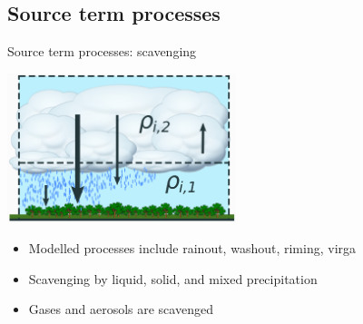 \documentclass[10pt]{beamer}
\begin{document}
\subsection{Source term processes}
\frame{\sectionpage}

\begin{frame}[fragile]{Source term processes: scavenging}
    \begin{center}
    \includegraphics[width=0.5\textwidth]{box-model-scav.eps}
    \end{center}
    \begin{itemize}
        \item Modelled processes include rainout, washout, riming, virga
        \item Scavenging by liquid, solid, and mixed precipitation
        \item Gases and aerosols are scavenged
    \end{itemize}
\end{frame}
\end{document}
